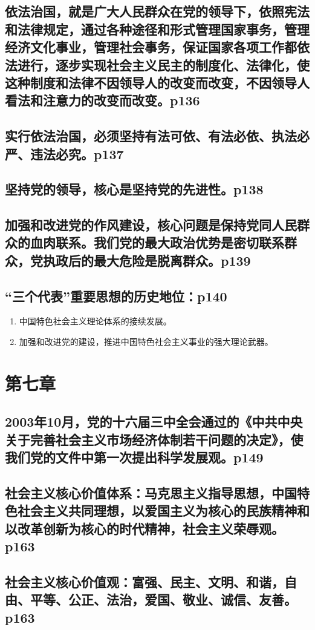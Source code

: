 \documentclass[UTF8]{ctexart}
\begin{document}
\subsection{依法治国，就是广大人民群众在党的领导下，依照宪法和法律规定，通过各种途径和形式管理国家事务，管理经济文化事业，管理社会事务，保证国家各项工作都依法进行，逐步实现社会主义民主的制度化、法律化，使这种制度和法律不因领导人的改变而改变，不因领导人看法和注意力的改变而改变。p136}
\subsection{实行依法治国，必须坚持有法可依、有法必依、执法必严、违法必究。p137}
\subsection{坚持党的领导，核心是坚持党的先进性。p138}
\subsection{加强和改进党的作风建设，核心问题是保持党同人民群众的血肉联系。我们党的最大政治优势是密切联系群众，党执政后的最大危险是脱离群众。p139}
\subsection{“三个代表”重要思想的历史地位：p140}
\begin{enumerate}[(1)]
    \item 中国特色社会主义理论体系的接续发展。
    \item 加强和改进党的建设，推进中国特色社会主义事业的强大理论武器。
\end{enumerate}
\section{第七章}
\subsection{2003年10月，党的十六届三中全会通过的《中共中央关于完善社会主义市场经济体制若干问题的决定》，使我们党的文件中第一次提出科学发展观。p149}
\subsection{社会主义核心价值体系：马克思主义指导思想，中国特色社会主义共同理想，以爱国主义为核心的民族精神和以改革创新为核心的时代精神，社会主义荣辱观。p163}
\subsection{社会主义核心价值观：富强、民主、文明、和谐，自由、平等、公正、法治，爱国、敬业、诚信、友善。p163}
\end{document}
